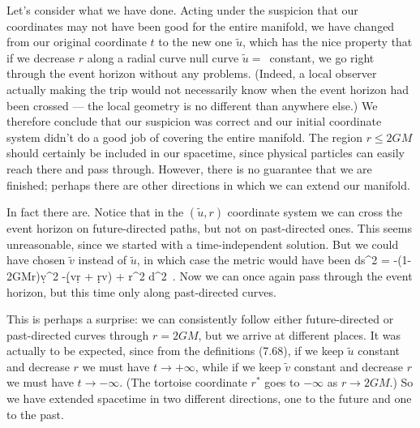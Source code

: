 Let's consider what we have done.  Acting under the suspicion that
our coordinates may not have been good for the entire manifold, we
have changed from our original coordinate $t$ to the new one $\tilde u$,
which has the nice property that if we decrease $r$ along a radial
curve null curve $\tilde u =$~constant, we go right through the
event horizon without any problems.  (Indeed, a local observer actually
making the trip would not necessarily know when the event horizon had
been crossed --- the local geometry is 
no different than anywhere else.)  We therefore
conclude that our suspicion was correct and our initial coordinate
system didn't do a good job of covering the entire manifold.  The region
$r\leq 2GM$ should certainly be included in our spacetime, since
physical particles can easily reach there and pass through.  However,
there is no guarantee that we are finished; perhaps there are other
directions in which we can extend our manifold.

In fact there are.  Notice that in the $(\tilde u, r)$ coordinate
system we can cross the event horizon on future-directed paths, but
not on past-directed ones.  This seems unreasonable, since we started
with a time-independent solution.  But we could have chosen $\tilde v$
instead of $\tilde u$, in which case the metric would have been
\be
  ds^2 = -\left(1-{{2GM}\over r}\right)\d{\tilde v}^2
  -(\d\tilde v\d r + \d r\d\tilde v) + r^2 d\Omega^2\ .\label{7.72}
\ee
Now we can once again pass through the event horizon, but this time
only along past-directed curves.

\begin{figure}
  \centerline{
  }
\end{figure}

This is perhaps a surprise: we can consistently follow either 
future-directed or past-directed curves through $r=2GM$, but we
arrive at different places.  It was actually to be expected, since
from the definitions (7.68), if we keep $\tilde u$ constant and decrease
$r$ we must have $t\rightarrow +\infty$, while if we keep
$\tilde v$ constant and decrease $r$ we must have $t\rightarrow -\infty$.
(The tortoise coordinate $r^*$ goes to $-\infty$ as $r\rightarrow 2GM$.)
So we have extended spacetime in two different directions, one to
the future and one to the past.


